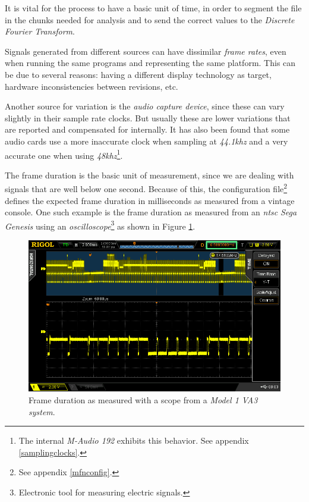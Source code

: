 \documentclass[10pt,a4paper]{report}
\newcommand{\ac}[1]{\textit{\acrshort{#1}}}
\newcommand{\khz}[1]{\textit{#1\acrshort{khz}}}
\begin{document}
\begin{appendices}
It is vital for the process to have a basic unit of time, in order to segment the file in the chunks needed for analysis and to send the correct values to the \textit{Discrete Fourier Transform}.

Signals generated from different sources can have dissimilar \textit{frame rates}, even when running the same programs and representing the same platform. This can be due to several reasons: having a different display technology as target, hardware inconsistencies between revisions, etc.

Another source for variation is the \textit{audio capture device}, since these can vary slightly in their sample rate clocks. But usually these are lower variations that are reported and compensated for internally. It has also been found that some audio cards use a more inaccurate clock when sampling at \khz{44.1} and a very accurate one when using \khz{48}\footnote{The internal \textit{M-Audio 192} exhibits this behavior. See appendix \ref{samplingclocks}.}.

The frame duration is the basic unit of measurement, since we are dealing with signals that are well below one second. Because of this, the configuration file\footnote{See appendix \ref{mfnconfig}.} defines the expected frame duration in milliseconds as measured from a vintage console. One such example is the frame duration as measured from an \ac{ntsc} \textit{Sega Genesis} using an \textit{oscilloscope}\footnote{Electronic tool for measuring electric signals.} as shown in Figure \ref{fig:frameratescope}.

\begin{figure}[H]
	\centering
	\includegraphics[width=1.0\linewidth]{images/scope/framerate-scope.png}
	\caption[Scope frame rate]{Frame duration as measured with a scope from a \textit{Model 1 VA3 system}.}
	\label{fig:frameratescope}
\end{figure}


\end{appendices}
\end{document}
